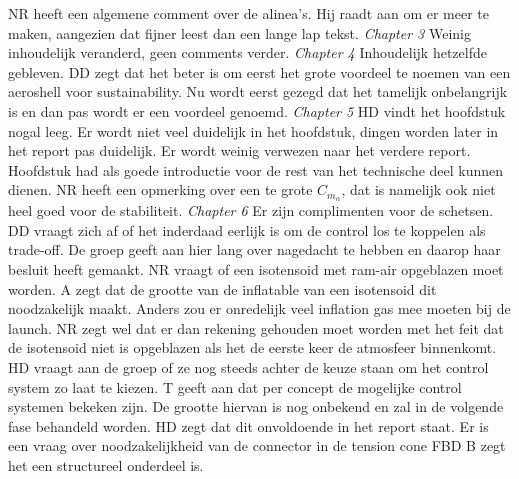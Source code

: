 NR heeft een algemene comment over de alinea's. Hij raadt aan om er meer te maken, aangezien dat fijner leest dan een lange lap tekst.
\newline\newline
\textit{Chapter 3}\newline
Weinig inhoudelijk veranderd, geen comments verder.
\newline\newline
\textit{Chapter 4}\newline
Inhoudelijk hetzelfde gebleven. DD zegt dat het beter is om eerst het grote voordeel te noemen van een aeroshell voor sustainability. Nu wordt eerst gezegd dat het tamelijk onbelangrijk is en dan pas wordt er een voordeel genoemd.
\newline\newline
\textit{Chapter 5}\newline
HD vindt het hoofdstuk nogal leeg. Er wordt niet veel duidelijk in het hoofdstuk, dingen worden later in het report pas duidelijk. Er wordt weinig verwezen naar het verdere report. Hoofdstuk had als goede introductie voor de rest van het technische deel kunnen dienen.\newline
NR heeft een opmerking over een te grote $C_{m_\alpha}$, dat is namelijk ook niet heel goed voor de stabiliteit.
\newline\newline
\textit{Chapter 6}\newline
Er zijn complimenten voor de schetsen. DD vraagt zich af of het inderdaad eerlijk is om de control los te koppelen als trade-off. De groep geeft aan hier lang over nagedacht te hebben en daarop haar besluit heeft gemaakt.\newline
NR vraagt of een isotensoid met ram-air opgeblazen moet worden. A zegt dat de grootte van de inflatable van een isotensoid dit noodzakelijk maakt. Anders zou er onredelijk veel inflation gas mee moeten bij de launch. NR zegt wel dat er dan rekening gehouden moet worden met het feit dat de isotensoid niet is opgeblazen als het de eerste keer de atmosfeer binnenkomt.\newline
HD vraagt aan de groep of ze nog steeds achter de keuze staan om het control system zo laat te kiezen. T geeft aan dat per concept de mogelijke control systemen bekeken zijn. De grootte hiervan is nog onbekend en zal in de volgende fase behandeld worden. HD zegt dat dit onvoldoende in het report staat.\newline
Er is een vraag over noodzakelijkheid van de connector in de tension cone FBD B zegt het een structureel onderdeel is.\newline
